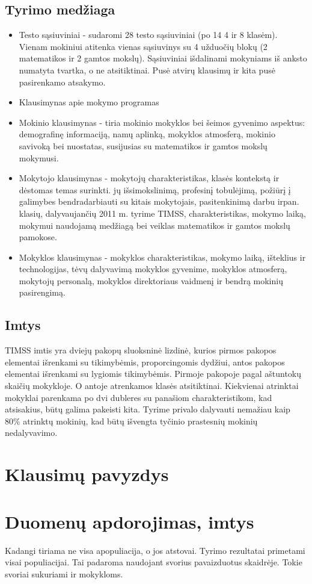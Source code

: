 \documentclass[12pt,a4paper]{article}
\begin{document}
\subsection{Tyrimo medžiaga}
\begin{itemize}
\item Testo sąsiuviniai - sudaromi 28 testo sąsiuviniai (po 14 4 ir 8 klasėm). Vienam mokiniui atitenka vienas sąsiuvinys su 4 užduočių blokų (2 matematikos ir 2 gamtos mokslų). Sąsiuviniai išdalinami mokyniams iš anksto numatyta tvartka, o ne atsitiktinai. Pusė atvirų klausimų ir kita pusė pasirenkamo atsakymo.
\item Klausimynas apie mokymo programas
\item Mokinio klausimynas - tiria mokinio mokyklos bei šeimos gyvenimo aspektus: demografinę informaciją, namų aplinką,
mokyklos atmosferą, mokinio savivoką bei nuostatas, susijusias su matematikos ir gamtos mokslų mokymusi.
\item Mokytojo klausimynas - mokytojų charakteristikas, klasės kontekstą ir dėstomas temas surinkti. jų išsimokslinimą, profesinį tobulėjimą, požiūrį į galimybes bendradarbiauti su kitais mokytojais, pasitenkinimą darbu irpan. klasių, dalyvaujančių 2011 m. tyrime TIMSS, charakteristikas, mokymo laiką, mokymui naudojamą medžiagą bei veiklas matematikos ir gamtos mokslų pamokose.
\item Mokyklos klausimynas - mokyklos charakteristikas, mokymo laiką, išteklius ir technologijas, tėvų dalyvavimą mokyklos gyvenime, mokyklos atmosferą, mokytojų personalą, mokyklos direktoriaus vaidmenį ir bendrą mokinių pasirengimą.
\end{itemize}
\subsection{Imtys}
TIMSS imtis yra dviejų pakopų sluoksninė lizdinė, kurios pirmos pakopos elementai išrenkami su tikimybėmis, proporcingomis dydžiui, antos pakopos elementai išrenkami su lygiomis tikimybėmis. Pirmoje pakopoje pagal aštuntokų skaičių mokykloje. O antoje atrenkamos klasės atsitiktinai. Kiekvienai atrinktai mokyklai parenkama po dvi dubleres su panašiom charakteristikom, kad atsisakius, būtų galima pakeisti kita. Tyrime privalo dalyvauti nemažiau kaip 80\% atrinktų mokinių, kad būtų išvengta tyčinio prastesnių mokinių nedalyvavimo.
\section{Klausimų pavyzdys}
\section{Duomenų apdorojimas, imtys}
Kadangi tiriama ne visa apopuliacija, o jos atstovai. Tyrimo rezultatai primetami visai populiacijai. Tai padaroma naudojant svorius pavaizduotus skaidrėje. Tokie svoriai sukuriami ir mokykloms.
\end{document}
